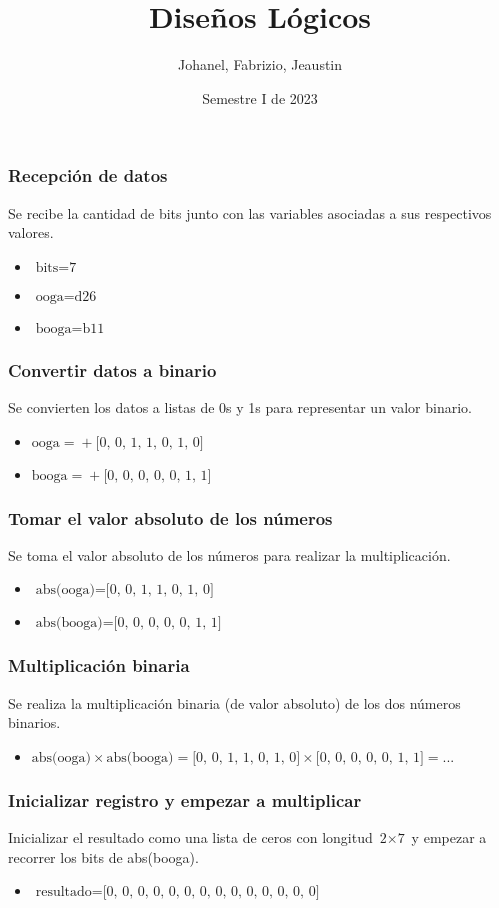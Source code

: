 \documentclass{beamer}
\title{Diseños Lógicos}
\author{Johanel, Fabrizio, Jeaustin}
\institute{Tecnológico de Costa Rica}
\date{Semestre I de 2023}
\begin{document}
\begin{frame}
\frametitle{Recepción de datos}
Se recibe la cantidad de bits junto con las variables asociadas a sus respectivos valores.
\begin{itemize}
\item $\text{bits}=\text{7}$
\item $\text{ooga}=\text{d26}$
\item $\text{booga}=\text{b11}$
\end{itemize}
\end{frame}
\begin{frame}
\frametitle{Convertir datos a binario}
Se convierten los datos a listas de 0s y 1s para representar un valor binario.
\begin{itemize}
\item $\text{ooga}=\text{}+\text{[0, 0, 1, 1, 0, 1, 0]}$
\item $\text{booga}=\text{}+\text{[0, 0, 0, 0, 0, 1, 1]}$
\end{itemize}
\end{frame}
\begin{frame}
\frametitle{Tomar el valor absoluto de los números}
Se toma el valor absoluto de los números para realizar la multiplicación.
\begin{itemize}
\item $\text{abs(ooga)}=\text{[0, 0, 1, 1, 0, 1, 0]}$
\item $\text{abs(booga)}=\text{[0, 0, 0, 0, 0, 1, 1]}$
\end{itemize}
\end{frame}
\begin{frame}
\frametitle{Multiplicación binaria}
Se realiza la multiplicación binaria (de valor absoluto) de los dos números binarios.
\begin{itemize}
\item $\text{abs(ooga)}\times\text{abs(booga)}=\text{[0, 0, 1, 1, 0, 1, 0]}\times\text{[0, 0, 0, 0, 0, 1, 1]}=\text{...}$
\end{itemize}
\end{frame}
\begin{frame}
\frametitle{Inicializar registro y empezar a multiplicar}
Inicializar el resultado como una lista de ceros con longitud $\text{2}\times\text{7}$ y empezar a recorrer los bits de abs(booga).
\begin{itemize}
\item $\text{resultado}=\text{[0, 0, 0, 0, 0, 0, 0, 0, 0, 0, 0, 0, 0, 0]}$
\end{itemize}
\end{frame}
\end{document}
